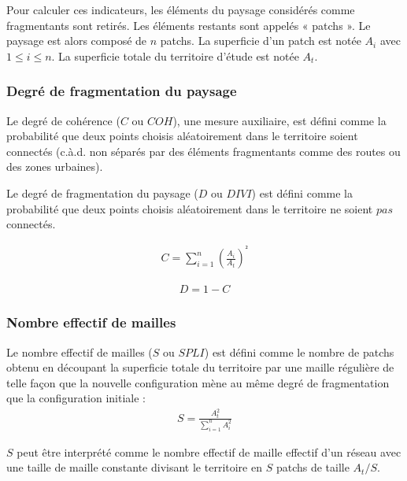 \documentclass[11pt]{article}
\begin{document}
Pour calculer ces indicateurs, les éléments du paysage considérés comme fragmentants sont retirés. Les éléments restants sont appelés « patchs ». Le paysage est alors composé de $n$ patchs. La superficie d'un patch est notée  $A_i$ avec $1 \leq i \leq n$. La superficie totale du territoire d'étude est notée $A_t$.

\subsubsection{Degré de fragmentation du paysage}

Le degré de cohérence ($C$ ou $COH$), une mesure auxiliaire, est défini comme la probabilité que deux points choisis aléatoirement dans le territoire soient connectés (c.à.d. non séparés par des éléments fragmentants comme des routes ou des zones urbaines).

Le degré de fragmentation du paysage ($D$ ou $DIVI$) est défini comme la probabilité que deux points choisis aléatoirement dans le territoire ne soient $pas$ connectés.

\hspace*{-0.5cm}
\begin{minipage}[c][1cm]{.46\linewidth}
\begin{align*}
C = \sum_{i=1}^{n}(\frac{A_{i}}{A_{t}})^{²}
\end{align*}
\end{minipage}
\begin{minipage}[c][1cm]{.46\linewidth}
\begin{align*}
D = 1 - C
\end{align*}
\end{minipage}

\subsubsection{Nombre effectif de mailles}

Le nombre effectif de mailles ($S$ ou $SPLI$) est défini comme le nombre de patchs obtenu en découpant la superficie totale du territoire par une maille régulière de telle façon que la nouvelle configuration mène au même degré de fragmentation que la configuration initiale :
\begin{align*}
S = \frac{A_{t}^{2}}{\sum_{i=1}^{n}A_{i}^{2}}
\end{align*}

$S$ peut être interprété comme le nombre effectif de maille effectif d'un réseau avec une taille de maille constante divisant le territoire en $S$ patchs de taille $A_{t} / S$.
\end{document}
